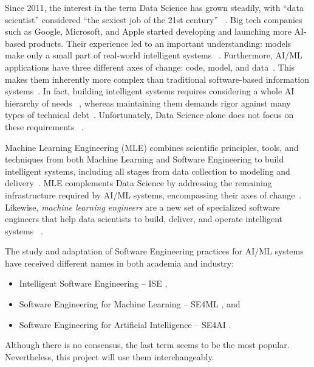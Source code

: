 Since 2011, the interest in the term Data Science has grown steadily,
with ``data scientist'' considered ``the sexiest job of the 21st century''%
~\parencite{Cao2018DataScience,Davenport2012DataCentury}. Big tech companies
such as Google, Microsoft, and Apple started developing and launching more
AI-based products. Their experience led to an important understanding:
models make only a small part of real-world intelligent systems%
~\mbox{\parencite{Hulten2018BuildingSystems,Sculley2015HiddenSystems}}.
Furthermore, AI/ML applications have three different axes of change:
code, model, and data~\parencite{Sato2019ContinuousLearning}.
This makes them inherently more complex than traditional software-based
information systems~\parencite{Amershi2019SoftwareStudy}. In fact, building
intelligent systems requires considering a whole AI hierarchy of needs%
~\parencite{Rogati2017TheNeeds}, whereas maintaining them demands rigor
against many types of technical debt~\parencite{Sculley2015HiddenSystems}.
Unfortunately, Data Science alone does not focus on these requirements%
~\parencite{Burkov2020MachineEngineering,Makinen2021WhoHelp,Menzies2020TheAI,
Sato2019ContinuousLearning}.

\clearpage

Machine Learning Engineering (MLE) combines scientific principles, tools,
and techniques from both Machine Learning and Software Engineering to build
intelligent systems, including all stages from data collection to modeling
and delivery~\parencite{Burkov2020MachineEngineering}. MLE complements
Data Science by addressing the remaining infrastructure required by AI/ML
systems, encompassing their axes of change~\parencite{Ozkaya2020WhatSystems,
Sato2019ContinuousLearning}. Likewise, \emph{machine learning engineers}
are a new set of specialized software engineers that help data scientists
to build, deliver, and operate intelligent systems%
~\mbox{\parencite{Burkov2020MachineEngineering,Lakshmanan2020MachinePatterns}}.

The study and adaptation of Software Engineering practices for AI/ML
systems have received different names in both academia and industry:
\begin{itemize}
  \item Intelligent Software Engineering -- ISE
        \parencite{Xie2018IntelligentEngineering},
  \item Software Engineering for Machine Learning -- SE4ML
        \parencite{Amershi2019SoftwareStudy,
                   Martinez-Fernandez2022SoftwareSurvey,
                   Sculley2015HiddenSystems}, and
  \item Software Engineering for Artificial Intelligence -- SE4AI 
        \parencite{Carleton2020TheSE,
                   Kastner2020TeachingSystems,
                   Martinez-Fernandez2022SoftwareSurvey,
                   Menzies2020TheAI}.
\end{itemize}
Although there is no consensus, the last term seems to be the most popular.
Nevertheless, this project will use them interchangeably.

